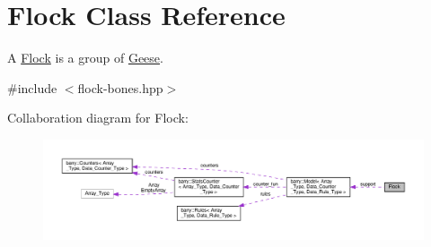 \hypertarget{class_flock}{}\section{Flock Class Reference}
\label{class_flock}


A \hyperlink{class_flock}{Flock} is a group of \hyperlink{class_geese}{Geese}.  




{\ttfamily \#include $<$flock-\/bones.\+hpp$>$}



Collaboration diagram for Flock\+:\nopagebreak
\begin{figure}[H]
\begin{center}
\leavevmode
\includegraphics[width=350pt]{class_flock__coll__graph}
\end{center}
\end{figure}
